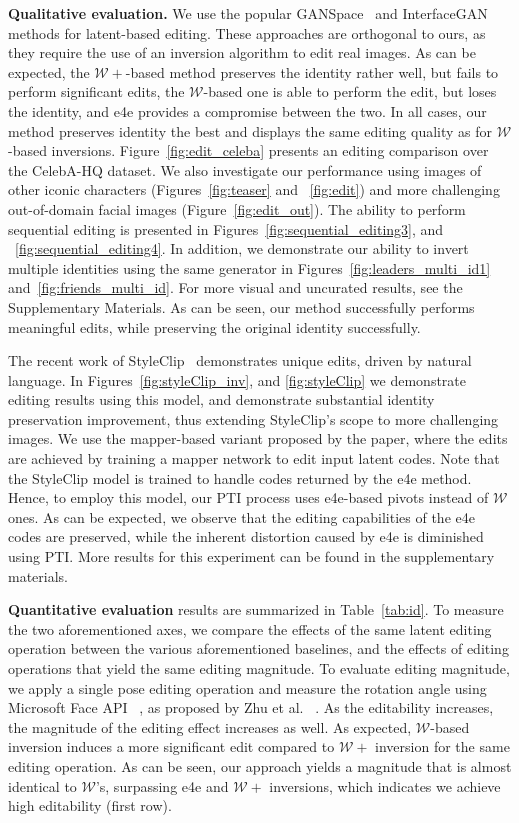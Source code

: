 {\bf Qualitative evaluation.} We use the popular GANSpace~\cite{harkonen2020ganspace} and InterfaceGAN~\cite{shen2020interpreting} methods for latent-based editing. These approaches are orthogonal to ours, as they require the use of an inversion algorithm to edit real images. As can be expected, the $\mathcal{W}+$-based method preserves the identity rather well, but fails to perform significant edits, the $\mathcal{W}$-based one is able to perform the edit, but loses the identity, and e4e provides a compromise between the two. In all cases, our method preserves identity the best and displays the same editing quality as for $\mathcal{W}$-based inversions. Figure~\ref{fig:edit_celeba} presents an editing comparison over the CelebA-HQ dataset. We also investigate our performance using images of other iconic characters (Figures~\ref{fig:teaser} and ~\ref{fig:edit}) and more challenging out-of-domain facial images (Figure~\ref{fig:edit_out}). The ability to perform sequential editing is presented in Figures~\ref{fig:sequential_editing3}, and ~\ref{fig:sequential_editing4}. In addition, we demonstrate our ability to invert multiple identities using the same generator in Figures~\ref{fig:leaders_multi_id1} and~\ref{fig:friends_multi_id}. 
For more visual and uncurated results, see the Supplementary Materials. As can be seen, our method successfully performs meaningful edits, while preserving the original identity successfully.

The recent work of StyleClip~\cite{patashnik2021styleclip} demonstrates unique edits, driven by natural language. In Figures~\ref{fig:styleClip_inv}, and \ref{fig:styleClip} we demonstrate editing results using this model, and demonstrate substantial identity preservation improvement, thus extending StyleClip's scope to more challenging images. We use the mapper-based variant proposed by the paper, where the edits are achieved by training a mapper network to edit input latent codes. Note that the StyleClip model is trained to handle codes returned by the e4e method. Hence, to employ this model, our PTI process uses e4e-based pivots instead of $\mathcal{W}$ ones. As can be expected, we observe that the editing capabilities of the e4e codes are preserved, while the inherent distortion caused by e4e is diminished using PTI. More results for this experiment can be found in the supplementary materials. 

{\bf Quantitative evaluation} results are summarized in Table~\ref{tab:id}. To measure the two aforementioned axes, we compare the effects of the same latent editing operation between the various aforementioned baselines, and the effects of editing operations that yield the same editing magnitude. To evaluate editing magnitude, we apply a single pose editing operation and measure the rotation angle using Microsoft Face API ~\cite{azure}, as proposed by Zhu et al. ~\cite{zhu2020improved}. As the editability increases, the magnitude of the editing effect increases as well. As expected, $\mathcal{W}$-based inversion induces a more significant edit compared to $\mathcal{W+}$ inversion for the same editing operation. As can be seen, our approach yields a magnitude that is almost identical to $\mathcal{W}$'s, surpassing e4e and $\mathcal{W+}$ inversions, which indicates we achieve high editability (first row). 

